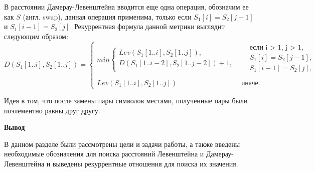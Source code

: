 В расстоянии Дамерау-Левенштейна вводится еще одна операция, обозначим ее как $S$ (англ. swap), данная операция применима, только  если $S_{1}[i] = S_{2}[j - 1]$
и $S_{1}[i - 1] = S_{2}[j]$. Рекуррентная формула  данной метрики выглядит следующим образом:
\small
\begin{equation}
	\label{eq:DL}
	D(S_{1}[1..i],S_{2}[1..j]) = 
	\begin{cases}
		min \begin{cases}
			Lev(S_{1}[1..i],S_{2}[1..j]),\\
			D(S_{1}[1..i - 2],S_{2}[1..j - 2]) + 1, \\
		\end{cases}
		& \begin{aligned}
			& \text{если i > 1, j > 1}, \\
			& S_{1}[i] = S_{2}[j - 1], \\
			& S_{1}[i - 1] = S_{2}[j], \\
		\end{aligned}\\
		Lev(S_{1}[1..i],S_{2}[1..j])
		 & \text{иначе.}
	\end{cases}
\end{equation}

Идея в том, что после замены пары символов местами, полученные пары были поэлементно равны друг другу.

\textbf{Вывод}

В данном разделе были рассмотрены цели и задачи работы, а также введены необходимые обозначения для поиска расстояний Левенштейна и Дамерау-Левенштейна
и выведены рекуррентные отношения для поиска их значения.

